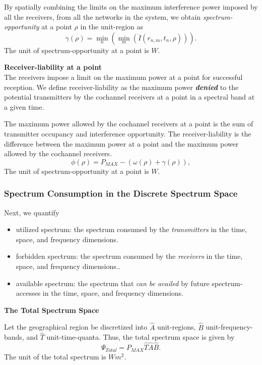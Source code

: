 \documentclass[journal,12pt,draftclsnofoot,onecolumn]{IEEEtran}
\begin{document}
By spatially combining the limits on the maximum interference power imposed by all the receivers, from all the networks in the system, we obtain \textit{spectrum-opportunity} at a point $\rho$ in the unit-region as
\begin{equation}
\gamma(\rho)	= \min_n (\min_m (\ddot{I}(r_{n,m}, t_n, \rho))) .
\end{equation}
The unit of spectrum-opportunity at a point is $W$.

\noindent
\textbf{Receiver-liability at a point} \\
The receivers impose a limit on the maximum power at a point for successful reception. We define receiver-liability as the maximum power \textbf{\textit{denied}} to the potential transmitters by the cochannel receivers at a point in a spectral band at a given time.

The maximum power allowed by the cochannel receivers at a point is the sum of transmitter occupancy and interference opportunity. The receiver-liability is the difference between the maximum power at a point and the maximum power allowed by the cochannel receivers.
\begin{equation}
\label{eq:sprlpt}
\phi(\rho) = P_{MAX} - (\omega(\rho) + \gamma(\rho)) ,
\end{equation}
The unit of spectrum-opportunity at a point is $W$.

\subsubsection{Spectrum Consumption in the Discrete Spectrum Space}
Next, we quantify 
\begin{itemize}
	\item utilized spectrum: the spectrum consumed by the \textit{transmitters} in the time, space, and frequency dimensions.
	\item forbidden spectrum: the spectrum consumed by the \textit{receivers} in the time, space, and frequency dimensions..
	\item available spectrum: the spectrum that \textit{can be availed} by future spectrum-accesses in the time, space, and frequency dimensions.
\end{itemize}

\noindent
\textbf{The Total Spectrum Space}

Let the geographical region be discretized into $\hat{A}$ unit-regions, $\hat{B}$ unit-frequency-bands, and $\hat{T}$ unit-time-quanta.  Thus, the total spectrum space is given by
\begin{equation}
\label{eq:p1totalspectrum}
\Psi_{Total} = P_{MAX} \hat{T} \hat{A} \hat{B} .
\end{equation}
The unit of the total spectrum is $Wm^2$. 
\end{document}
